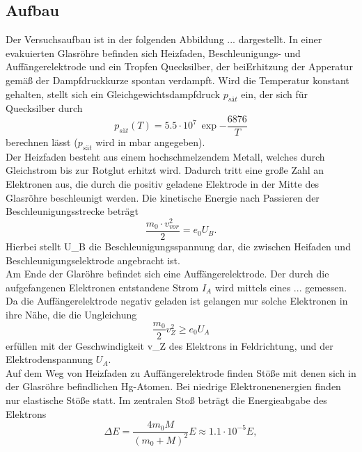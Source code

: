 \subsection{Aufbau}
    Der Versuchsaufbau ist in der folgenden Abbildung ... dargestellt. In einer evakuierten Glasröhre
    befinden sich Heizfaden, Beschleunigungs- und Auffängerelektrode und ein Tropfen 
    Quecksilber, der beiErhitzung der Apperatur gemäß der Dampfdruckkurze spontan 
    verdampft. Wird die Temperatur konstant gehalten, stellt sich ein Gleichgewichtsdampfdruck 
    $p_{sät}$ ein, der sich für Quecksilber durch
    \begin{equation}
        p_{sät}(T)=5.5\cdot 10^{7} \ \exp{-\dfrac{6876}{T}}
    \end{equation}
    berechnen lässt ($p_{sät}$ wird in mbar angegeben).\\
    \noindent Der Heizfaden besteht aus einem hochschmelzendem Metall, welches durch Gleichstrom
    bis zur Rotglut erhitzt wird. Dadurch tritt eine große Zahl an Elektronen aus, die durch die 
    positiv geladene Elektrode in der Mitte des Glasröhre beschleunigt werden. Die kinetische Energie
    nach Passieren der Beschleunigungsstrecke beträgt
    \begin{equation}
        \dfrac{m_0\cdot v_{vor}^2}{2}=e_0 U_B.
    \end{equation}
    Hierbei stellt U_B die Beschleunigungsspannung dar, die zwischen Heifaden und 
    Beschleunigungselektrode angebracht ist.\\
    \noindent Am Ende der Glaröhre befindet sich eine Auffängerelektrode. Der durch die aufgefangenen
    Elektronen entstandene Strom $I_A$ wird mittels eines ... gemessen. Da die Auffängerelektrode
    negativ geladen ist gelangen nur solche Elektronen in ihre Nähe, die die Ungleichung 
    \begin{equation}
        \dfrac{m_0}{2}v_Z^2 \geq e_0 U_A
    \end{equation}
    erfüllen mit der Geschwindigkeit v_Z des Elektrons in Feldrichtung, und der Elektrodenspannung
    $U_A$.\\
    Auf dem Weg von Heizfaden zu Auffängerelektrode finden Stöße mit denen sich in der 
    Glasröhre befindlichen Hg-Atomen. Bei niedrige Elektronenenergien finden nur 
    elastische Stöße statt. Im zentralen Stoß beträgt die Energieabgabe des Elektrons
    \begin{equation}
        \Delta E = \dfrac{4 m_0 M}{(m_0 + M)^2}E \approx 1.1\cdot 10^{-5}E,
    \end{equation}
